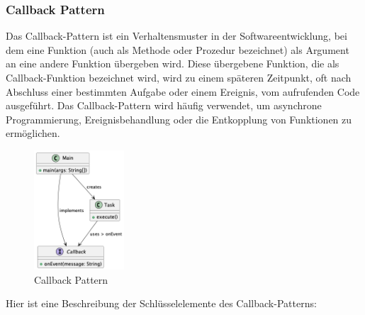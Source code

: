 \subsubsection{Callback Pattern}
Das Callback-Pattern ist ein Verhaltensmuster in der Softwareentwicklung, bei dem eine Funktion (auch als Methode oder Prozedur bezeichnet) als Argument an eine andere Funktion übergeben wird. Diese übergebene Funktion, die als Callback-Funktion bezeichnet wird, wird zu einem späteren Zeitpunkt, oft nach Abschluss einer bestimmten Aufgabe oder einem Ereignis, vom aufrufenden Code ausgeführt. Das Callback-Pattern wird häufig verwendet, um asynchrone Programmierung, Ereignisbehandlung oder die Entkopplung von Funktionen zu ermöglichen.
\begin{figure}[!ht]
  \centering
  \includegraphics[width=0.30\textwidth]{fig/uml/callback-class.png}
  \caption{Callback Pattern}
  \label{fig:callback-class}
\end{figure}
Hier ist eine Beschreibung der Schlüsselelemente des Callback-Patterns:

